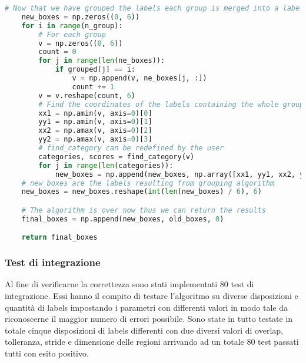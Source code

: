 \begin{lstlisting}[language=Python, caption=Python example]
    # Now that we have grouped the labels each group is merged into a label containing all of them
    new_boxes = np.zeros((0, 6))
    for i in range(n_group):
        # For each group
        v = np.zeros((0, 6))
        count = 0
        for j in range(len(ne_boxes)):
            if grouped[j] == i:
                v = np.append(v, ne_boxes[j, :])
                count += 1
        v = v.reshape(count, 6)
        # Find the coordinates of the labels containing the whole group
        xx1 = np.amin(v, axis=0)[0]
        yy1 = np.amin(v, axis=0)[1]
        xx2 = np.amax(v, axis=0)[2]
        yy2 = np.amax(v, axis=0)[3]
        # find_category can be redefined by the user
        categories, scores = find_category(v)
        for j in range(len(categories)):
            new_boxes = np.append(new_boxes, np.array([xx1, yy1, xx2, yy2, categories[j], scores[j]]))
    # new_boxes are the labels resulting from grouping algorithm
    new_boxes = new_boxes.reshape(int(len(new_boxes) / 6), 6)

    # The algorithm is over now thus we can return the results
    final_boxes = np.append(new_boxes, old_boxes, 0)

    return final_boxes
\end{lstlisting}
\subsubsection{Test di integrazione}
Al fine di verificarne la correttezza sono stati implementati 80 test di integrazione. Essi hanno il compito di testare l'algoritmo su diverse disposizioni e quantità di labels impostando i parametri con differenti valori in modo tale da riconoscerne il maggior numero di errori possibile. Sono state in tutto testate in totale cinque disposizioni di labels differenti con due diversi valori di overlap, tolleranza, stride e dimensione delle regioni arrivando ad un totale 80 test passati tutti con esito positivo.

